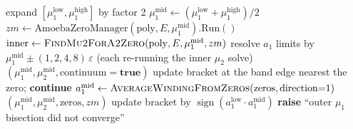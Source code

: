 \begin{algorithm}
\caption{\textsc{BisectAmoebaRonkinMin}$(\mathrm{poly},\allowbreak E;\allowbreak \mu_1^{\mathrm{low}},\allowbreak \mu_1^{\mathrm{high}},\allowbreak \mu_2^{\mathrm{low}},\allowbreak \mu_2^{\mathrm{high}},\allowbreak n_{\max},\allowbreak \mathrm{tol})$\\
outer bisection: nested 1-D root finds of $a_2=0$ and $a_1=0$, i.e.\ $\nabla R=0$.}
\label{alg:bisect-ronkin}
\begin{algorithmic}[1]
\State {}
  \State expand $[\mu_1^{\mathrm{low}},\mu_1^{\mathrm{high}}]$ by factor 2 
\EndWhile
{}
  \State $\mu_1^{\mathrm{mid}}\gets(\mu_1^{\mathrm{low}}+\mu_1^{\mathrm{high}})/2$
  \State $zm\gets\mathrm{AmoebaZeroManager}(\mathrm{poly},E,\mu_1^{\mathrm{mid}}).\mathrm{Run}()$ 
  \State $\mathrm{inner}\gets\textsc{FindMu2ForA2Zero}(\mathrm{poly},E,\mu_1^{\mathrm{mid}},zm)$
    \State resolve $a_1$ limits by $\mu_1^{\mathrm{mid}}\pm(1,2,4,8)\,\varepsilon$ (each re-running the inner $\mu_2$ solve)
      \State \Return $(\mu_1^{\mathrm{mid}},\mu_2^{\mathrm{mid}},\mathrm{continuum}{=}\mathbf{true})$ 
    \Else
      \State update bracket at the band edge nearest the zero; \textbf{continue}
    \EndIf
  \Else
    \State $a_1^{\mathrm{mid}}\gets\textsc{AverageWindingFromZeros}(\mathrm{zeros},\mathrm{direction}{=}1)$ 
      \State \Return $(\mu_1^{\mathrm{mid}},\mu_2^{\mathrm{mid}},\mathrm{zeros},zm)$ 
    \EndIf
    \State update bracket by $\operatorname{sign}(a_1^{\mathrm{low}}\cdot a_1^{\mathrm{mid}})$
  \EndIf
\EndFor
\State \textbf{raise} ``outer $\mu_1$ bisection did not converge''
\end{algorithmic}
\end{algorithm}

